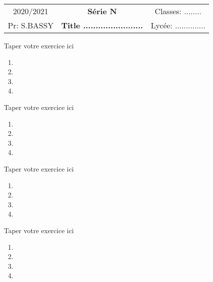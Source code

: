 \documentclass[a4paper, 12pt]{report}
\begin{document}
\begin{tcolorbox}[colback=red!5!white,colframe=red!75!black]
\begin{center}
 \begin{tabular}{c c  c}
 2020/2021  \hspace*{1.5cm}   & \textbf{{\huge Série N  }} &  \hspace*{1.5cm} Classes: ........ \\
 Pr: S.BASSY\hspace*{1.5cm} &{\huge \textbf{ Title ........................}} & \hspace*{1cm}Lycée: .............. \end{tabular}
\end{center}
\end{tcolorbox}
\begin{myexo}
Taper votre exercice ici
\begin{multicols}{2}
\begin{enumerate}
 \item 
 \item 
 \item 
 \item
\end{enumerate}
\end{multicols}
\end{myexo}
\begin{myexo}
 Taper votre exercice ici
 \begin{enumerate}
 \item 
 \item 
 \item 
 \item
 \end{enumerate}
\end{myexo}
\begin{myexo}
 Taper votre exercice ici
 \begin{enumerate}
 \item 
 \item 
 \item 
 \item
 \end{enumerate}
\end{myexo}
\begin{myexo}
 Taper votre exercice ici
 \begin{enumerate}
 \item 
 \item 
 \item 
 \item
 \end{enumerate}
\end{myexo}
\end{document}
